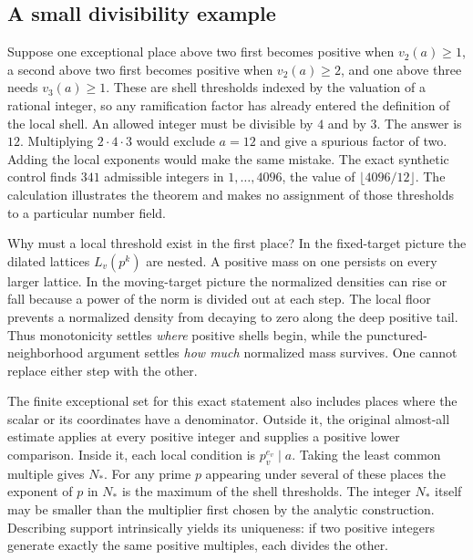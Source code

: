 \documentclass[12pt,letterpaper]{article}
\begin{document}
\subsection{A small divisibility example}
Suppose one exceptional place above two first becomes positive when $v_2(a)\ge1$, a second above two first becomes positive when $v_2(a)\ge2$, and one above three needs $v_3(a)\ge1$. These are shell thresholds indexed by the valuation of a rational integer, so any ramification factor has already entered the definition of the local shell. An allowed integer must be divisible by $4$ and by $3$. The answer is $12$. Multiplying $2\cdot4\cdot3$ would exclude $a=12$ and give a spurious factor of two. Adding the local exponents would make the same mistake. The exact synthetic control finds $341$ admissible integers in $1,\ldots,4096$, the value of $\lfloor4096/12\rfloor$. The calculation illustrates the theorem and makes no assignment of those thresholds to a particular number field.
\par
Why must a local threshold exist in the first place? In the fixed-target picture the dilated lattices $L_v(p^k)$ are nested. A positive mass on one persists on every larger lattice. In the moving-target picture the normalized densities can rise or fall because a power of the norm is divided out at each step. The local floor prevents a normalized density from decaying to zero along the deep positive tail. Thus monotonicity settles \emph{where} positive shells begin, while the punctured-neighborhood argument settles \emph{how much} normalized mass survives. One cannot replace either step with the other.
\par
The finite exceptional set for this exact statement also includes places where the scalar or its coordinates have a denominator. Outside it, the original almost-all estimate applies at every positive integer and supplies a positive lower comparison. Inside it, each local condition is $p_v^{e_v}\mid a$. Taking the least common multiple gives $N_*$. For any prime $p$ appearing under several of these places the exponent of $p$ in $N_*$ is the maximum of the shell thresholds. The integer $N_*$ itself may be smaller than the multiplier first chosen by the analytic construction. Describing support intrinsically yields its uniqueness: if two positive integers generate exactly the same positive multiples, each divides the other.
\end{document}
